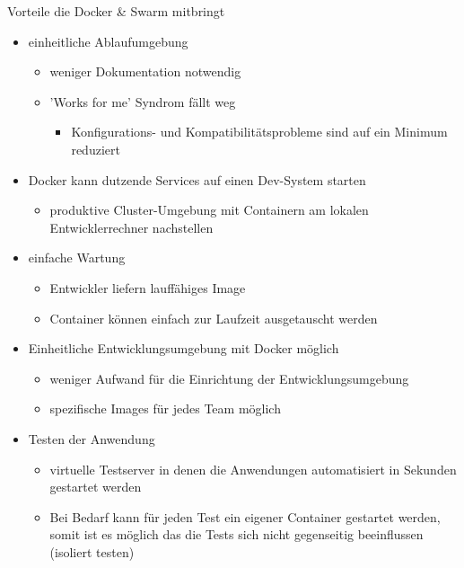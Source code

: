 \documentclass[final]{beamer}
\newlength{\onecolwid}
\begin{document}
\begin{frame}
\begin{columns}[t]
\begin{column}{\onecolwid}
\begin{block}{Vorteile die Docker \& Swarm mitbringt}
\begin{itemize}
\item einheitliche Ablaufumgebung
\begin{itemize}
\item weniger Dokumentation notwendig
\item 'Works for me' Syndrom fällt weg
\begin{itemize}
\item Konfigurations- und Kompatibilitätsprobleme sind auf ein Minimum reduziert
\end{itemize}
\end{itemize}
\item Docker kann dutzende Services auf einen Dev-System starten
\begin{itemize}
\item produktive Cluster-Umgebung mit Containern am lokalen Entwicklerrechner nachstellen
\end{itemize}
\item einfache Wartung
\begin{itemize}
\item Entwickler liefern lauffähiges Image
\item Container können einfach zur Laufzeit ausgetauscht werden
\end{itemize}
\item Einheitliche Entwicklungsumgebung mit Docker möglich
\begin{itemize}
\item weniger Aufwand für die Einrichtung der Entwicklungsumgebung
\item spezifische Images für jedes Team möglich
\end{itemize}
\item Testen der Anwendung
\begin{itemize}
\item virtuelle Testserver in denen die Anwendungen automatisiert in Sekunden gestartet werden
\item Bei Bedarf kann für jeden Test ein eigener Container gestartet werden, somit ist es möglich das die Tests sich nicht gegenseitig beeinflussen (isoliert testen)
\end{itemize}
\end{itemize}


\end{block}
\end{column}
\end{columns}
\end{frame}
\end{document}
